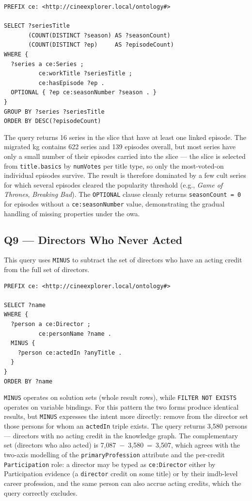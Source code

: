 \begin{lstlisting}[language=SPARQL]
PREFIX ce: <http://cineexplorer.local/ontology#>

SELECT ?seriesTitle
       (COUNT(DISTINCT ?season) AS ?seasonCount)
       (COUNT(DISTINCT ?ep)     AS ?episodeCount)
WHERE {
  ?series a ce:Series ;
          ce:workTitle ?seriesTitle ;
          ce:hasEpisode ?ep .
  OPTIONAL { ?ep ce:seasonNumber ?season . }
}
GROUP BY ?series ?seriesTitle
ORDER BY DESC(?episodeCount)
\end{lstlisting}

The query returns 16 series in the slice that have at least one linked episode. The migrated \ac{kg} contains 622 series and 139 episodes overall, but most series have only a small number of their episodes carried into the slice --- the slice is selected from \texttt{title.basics} by \texttt{numVotes} per title type, so only the most-voted-on individual episodes survive. The result is therefore dominated by a few cult series for which several episodes cleared the popularity threshold (e.g., \emph{Game of Thrones}, \emph{Breaking Bad}). The \texttt{OPTIONAL} clause cleanly returns \texttt{seasonCount~=~0} for episodes without a \texttt{ce:seasonNumber} value, demonstrating the gradual handling of missing properties under the \ac{owa}.

\subsection{Q9 — Directors Who Never Acted}

This query uses \texttt{MINUS} to subtract the set of directors who have an acting credit from the full set of directors.

\begin{lstlisting}[language=SPARQL]
PREFIX ce: <http://cineexplorer.local/ontology#>

SELECT ?name
WHERE {
  ?person a ce:Director ;
          ce:personName ?name .
  MINUS {
    ?person ce:actedIn ?anyTitle .
  }
}
ORDER BY ?name
\end{lstlisting}

\texttt{MINUS} operates on solution sets (whole result rows), while \texttt{FILTER NOT EXISTS} operates on variable bindings. For this pattern the two forms produce identical results, but \texttt{MINUS} expresses the intent more directly: remove from the director set those persons for whom an \texttt{actedIn} triple exists. The query returns 3{,}580 persons --- directors with no acting credit in the knowledge graph. The complementary set (directors who also acted) is 7{,}087~$-$~3{,}580~=~3{,}507, which agrees with the two-axis modelling of the \texttt{primaryProfession} attribute and the per-credit \texttt{Participation} role: a director may be typed as \texttt{ce:Director} either by Participation evidence (a \texttt{director} credit on some title) or by their \ac{imdb}-level career profession, and the same person can also accrue acting credits, which the query correctly excludes.


